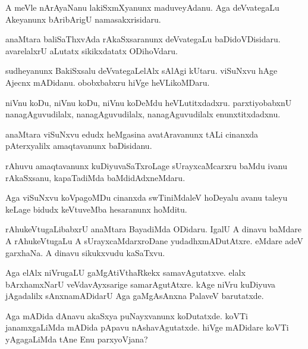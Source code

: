 \begin{mng}
A meVle nArAyaNanu lakiSxmXyanunx maduveyAdanu. Aga deVvategaLu Akeyanunx bAribArigU namasakxrisidaru.
\end{mng}

\begin{mng}
anaMtara baliSaThxvAda rAkaSxsaranunx deVvategaLu baDidoVDisidaru. avarelalxrU aLutatx sikikxdatatx ODihoVdaru.
\end{mng}

\begin{mng}
sudheyanunx BakiSxsalu deVvategaLelAlx sAlAgi kUtaru. viSuNxvu hAge Ajecnx mADidanu. obobxbabxru hiVge heVLikoMDaru.
\end{mng}

\begin{mng}
niVnu koDu, niVnu koDu, niVnu koDeMdu heVLutitxdadxru. parxtiyobabxnU nanagAguvudilalx, nanagAguvudilalx, nanagAguvudilalx enunxtitxdadxnu.
\end{mng}

\begin{mng}
anaMtara viSuNxvu edudx heMgasina avatAravanunx tALi cinanxda pAterxyalilx amaqtavanunx baDisidanu.
\end{mng}

\begin{mng}
rAhuvu amaqtavanunx kuDiyuvaSaTxroLage sUrayxcaMcarxru baMdu ivanu rAkaSxsanu, kapaTadiMda baMdidAdxneMdaru.
\end{mng}

\begin{mng}
Aga viSuNxvu koVpagoMDu cinanxda swTiniMdaleV hoDeyalu avanu taleyu keLage bidudx keVtuveMba hesaranunx hoMditu.
\end{mng}

\begin{mng}
rAhukeVtugaLibabxrU anaMtara BayadiMda ODidaru. IgalU A dinavu baMdare A rAhukeVtugaLu A sUrayxcaMdarxroDane yudadhxmADutAtxre. eMdare adeV garxhaNa. A dinavu sikukxvudu kaSaTxvu.
\end{mng}

\begin{mng}
Aga elAlx niVrugaLU gaMgAtiVthaRkekx samavAgutatxve. elalx bArxhamxNarU veVdavAyxsarige samarAgutAtxre. kAge niVru kuDiyuva jAgadalilx sAnxnamADidarU Aga gaMgAsAnxna PalaveV barutatxde.
\end{mng}

\begin{mng}
Aga mADida dAnavu akaSxya puNayxvanunx koDutatxde. koVTi janamxgaLiMda mADida pApavu nAshavAgutatxde. hiVge mADidare koVTi yAgagaLiMda tAne Enu parxyoVjana?
\end{mng}

